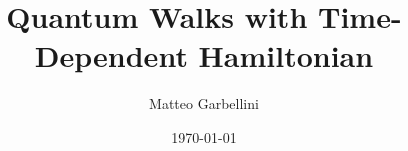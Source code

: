 \documentclass[aps,pra,reprint, onecolumn]{revtex4-2}
\begin{document}
\title{Quantum Walks with Time-Dependent Hamiltonian}


\author{Matteo Garbellini}


\date{\today}



\maketitle
\end{document}
